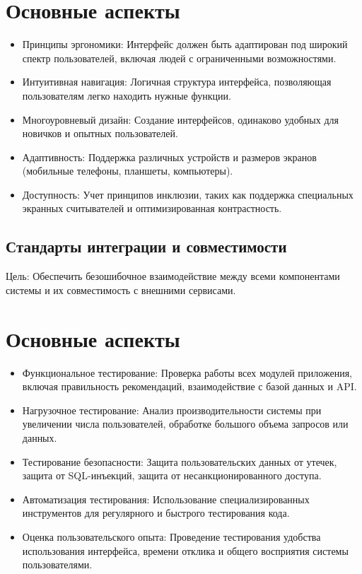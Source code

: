 \section*{Основные аспекты}
\begin{itemize}
    \item Принципы эргономики: Интерфейс должен быть адаптирован под широкий спектр пользователей, включая людей с ограниченными возможностями.
    \item Интуитивная навигация: Логичная структура интерфейса, позволяющая пользователям легко находить нужные функции.
    \item Многоуровневый дизайн: Создание интерфейсов, одинаково удобных для новичков и опытных пользователей.
    \item Адаптивность: Поддержка различных устройств и размеров экранов (мобильные телефоны, планшеты, компьютеры).
    \item Доступность: Учет принципов инклюзии, таких как поддержка специальных экранных считывателей и оптимизированная контрастность.
\end{itemize}

\subsection{Стандарты интеграции и совместимости}

Цель: Обеспечить безошибочное взаимодействие между всеми компонентами системы и их совместимость с внешними сервисами.
\section*{Основные аспекты}
\begin{itemize}
    \item Функциональное тестирование: Проверка работы всех модулей приложения, включая правильность рекомендаций, взаимодействие с базой данных и API.
    \item Нагрузочное тестирование: Анализ производительности системы при увеличении числа пользователей, обработке большого объема запросов или данных.
    \item Тестирование безопасности: Защита пользовательских данных от утечек, защита от SQL-инъекций, защита от несанкционированного доступа.
    \item Автоматизация тестирования: Использование специализированных инструментов для регулярного и быстрого тестирования кода.
    \item Оценка пользовательского опыта: Проведение тестирования удобства использования интерфейса, времени отклика и общего восприятия системы пользователями.
\end{itemize}

